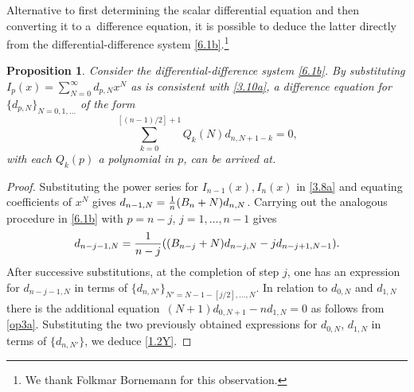 \documentclass[pdftex]{sigma}
\numberwithin{equation}{section}
\newtheorem{Proposition}[Theorem]{Proposition}
\theoremstyle{definition}
\begin{document}
Alternative to first determining the scalar differential equation and then converting it to a~difference equation, it is possible to deduce the latter directly from the differential-difference system \eqref{6.1b}.\footnote{We thank Folkmar Bornemann for this observation.}
\begin{Proposition}\label{P3.4e}
Consider the differential-difference system \eqref{6.1b}. By substituting $I_p(x) = \sum_{N=0}^\infty d_{p,N} x^N$ as is consistent with \eqref{3.10a}, a difference equation
for $\{ d_{p,N} \}_{N=0,1,\dots}$
of the form
\begin{equation}\label{1.2Y}
\sum_{k=0}^{[(n-1)/2]+1} Q_k(N) d_{n,N+1-k}=0,
\end{equation}
with each $Q_k(p)$ a polynomial in $p$, can be arrived at.
\end{Proposition}

\begin{proof}
Substituting the power series for $I_{n-1}(x), I_n(x)$ in \eqref{3.8a} and equating coefficients of $x^N$ gives
$%
d_{n-1,N} = {1 \over n } ( B_n + N) d_{n,N} $.
Carrying out the analogous procedure in \eqref{6.1b} with $p=n-j$, $j=1,\dots,n-1$ gives
\[%
d_{n-j-1,N} = {1 \over n - j } ( (B_{n-j} + N) d_{n-j,N} - j d_{n-j+1,N-1} ) .
\]
After successive substitutions, at the completion of step $j$, one has an expression for $d_{n-j-1,N}$ in terms of $\{d_{n,N'} \}_{N'=N-1-[j/2],\dots,N}$.
In relation to $d_{0,N}$ and $d_{1,N}$ there is the additional
equation~$%
(N+1) d_{0,N+1} - n d_{1,N} = 0
$
as follows from \eqref{op3a}. Substituting the two previously obtained expressions for $d_{0,N}$, $d_{1,N}$ in terms of $\{d_{n,N'} \}$, we deduce \eqref{1.2Y}.
\end{proof}
\end{document}
